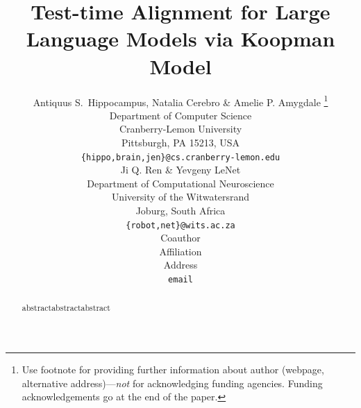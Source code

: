 \documentclass{article} %
\title{Test-time Alignment for Large Language Models via Koopman Model}
\author{Antiquus S.~Hippocampus, Natalia Cerebro \& Amelie P. Amygdale \thanks{ Use footnote for providing further information
about author (webpage, alternative address)---\emph{not} for acknowledging
funding agencies.  Funding acknowledgements go at the end of the paper.} \\
Department of Computer Science\\
Cranberry-Lemon University\\
Pittsburgh, PA 15213, USA \\
\texttt{\{hippo,brain,jen\}@cs.cranberry-lemon.edu} \\
\And
Ji Q. Ren \& Yevgeny LeNet \\
Department of Computational Neuroscience \\
University of the Witwatersrand \\
Joburg, South Africa \\
\texttt{\{robot,net\}@wits.ac.za} \\
\AND
Coauthor \\
Affiliation \\
Address \\
\texttt{email}
}
\begin{document}
\maketitle

\begin{abstract}
abstractabstractabstract
\end{abstract}












\end{document}
